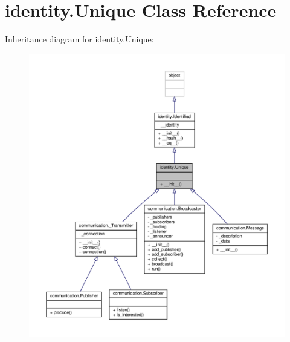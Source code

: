 \hypertarget{classidentity_1_1Unique}{}\section{identity.\+Unique Class Reference}
\label{classidentity_1_1Unique}


Inheritance diagram for identity.\+Unique\+:
\nopagebreak
\begin{figure}[H]
\begin{center}
\leavevmode
\includegraphics[width=350pt]{classidentity_1_1Unique__inherit__graph}
\end{center}
\end{figure}


